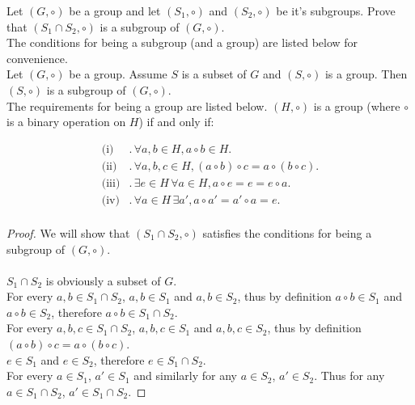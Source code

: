 \documentclass[addpoints]{exam}
\begin{document}
\begin{questions}
\question[2] Let $(G,\circ)$ be a group and let $(S_{1},\circ)$ and $(S_{2},\circ)$ be it's subgroups. Prove that $(S_{1}\cap S_{2},\circ)$ is a subgroup of $(G,\circ)$.\\

The conditions for being a subgroup (and a group) are listed below for convenience.\\
Let $(G,\circ)$ be a group. Assume $S$ is a subset of $G$ and $(S,\circ)$ is a group. Then $(S,\circ)$ is a subgroup of $(G,\circ)$.\\
The requirements for being a group are listed below. $(H,\circ)$ is a group (where $\circ$ is a binary operation on $H$) if and only if:

\begin{align*}
\textrm{(i)}&.\,\forall a,b\in H, a\circ b\in H.\\
\textrm{(ii)}&.\,\forall a,b,c\in H, (a\circ b)\circ c=a\circ(b\circ c).\\
\textrm{(iii)}&.\,\exists e\in H\,\forall a\in H, a\circ e=e=e\circ a.\\
\textrm{(iv)}&.\,\forall a\in H\,\exists a', a\circ a'=a'\circ a=e.\\
\end{align*}

\begin{solution}
\begin{proof}
We will show that $(S_{1}\cap S_{2},\circ)$ satisfies the conditions for being a subgroup of $(G,\circ)$.\\
\\
$S_{1}\cap S_{2}$ is obviously a subset of $G$.
\\
For every $a,b\in S_{1}\cap S_{2}$, $a,b\in S_{1}$ and $a,b\in S_{2}$, thus by definition $a\circ b\in S_{1}$ and $a\circ b\in S_{2}$, therefore $a\circ b\in S_{1}\cap S_{2}$.\\
For every $a,b,c\in S_{1}\cap S_{2}$, $a,b,c\in S_{1}$ and $a,b,c\in S_{2}$, thus by definition $(a\circ b)\circ c=a\circ(b\circ c)$.\\
$e\in S_{1}$ and $e\in S_{2}$, therefore $e\in S_{1}\cap S_{2}$.\\
For every $a\in S_{1}$, $a'\in S_{1}$ and similarly for any $a\in S_{2}$, $a'\in S_{2}$. Thus for any $a\in S_{1}\cap S_{2}$, $a'\in S_{1}\cap S_{2}$.
\end{proof}
\end{solution}
\newpage




\end{questions}
\end{document}
